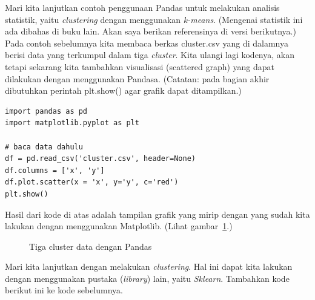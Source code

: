 Mari kita lanjutkan contoh penggunaan Pandas untuk melakukan analisis
statistik, yaitu {\em clustering} dengan menggunakan {\em k-means}.
(Mengenai statistik ini ada dibahas di buku lain.
Akan saya berikan referensinya di versi berikutnya.)
Pada contoh sebelumnya kita membaca berkas cluster.csv yang di dalamnya
berisi data yang terkumpul dalam tiga {\em cluster}.
Kita ulangi lagi kodenya, akan tetapi sekarang kita tambahkan visualisasi
(scattered graph) yang dapat dilakukan dengan menggunakan Pandasa.
(Catatan: pada bagian akhir dibutuhkan perintah plt.show() agar grafik
dapat ditampilkan.)

\begin{verbatim}
import pandas as pd
import matplotlib.pyplot as plt
   
# baca data dahulu
df = pd.read_csv('cluster.csv', header=None)
df.columns = ['x', 'y']
df.plot.scatter(x = 'x', y='y', c='red')
plt.show()
\end{verbatim}

Hasil dari kode di atas adalah tampilan grafik yang mirip dengan
yang sudah kita lakukan dengan menggunakan Matplotlib.
(Lihat gambar~\ref{fig:3cluster}.)

\begin{figure}[ht]
   \caption{Tiga cluster data dengan Pandas}
   \label{fig:3cluster}
\end{figure}

Mari kita lanjutkan dengan melakukan {\em clustering}.
Hal ini dapat kita lakukan dengan menggunakan pustaka ({\em library})
lain, yaitu {\em Sklearn}.
Tambahkan kode berikut ini ke kode sebelumnya.

